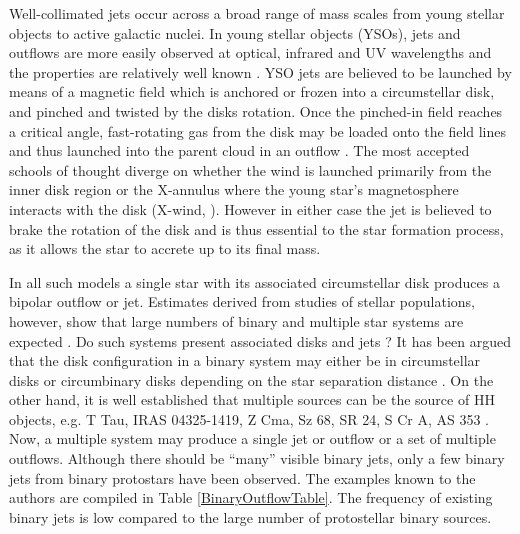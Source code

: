 \documentclass{aa}
\begin{document}
Well-collimated jets occur across a broad range of mass scales from young stellar objects to active galactic nuclei.
In young stellar objects (YSOs), jets and outflows are 
more easily observed at optical, infrared and UV wavelengths and the properties
are relatively well known \citep{2001ARA&A..39..403R,2007prpl.conf..231R}.
YSO jets are believed to be launched by means of a magnetic field which is 
anchored or frozen into a circumstellar disk, and pinched and twisted by the disks rotation. 
Once the pinched-in field reaches a critical angle, fast-rotating gas from the disk may be loaded onto the field lines and thus launched into the parent cloud in an outflow \citep{1982MNRAS.199..883B}.
The most accepted schools of thought diverge on whether the wind is launched primarily
from the inner disk region \citep[disk wind, ][]{1997A&A...319..340F,2000prpl.conf..759K} or the X-annulus where the young star's magnetosphere interacts with the disk (X-wind, \citep{2000prpl.conf..789S}). 
However in either case the jet is believed to brake the rotation of the disk 
and is thus essential to the star formation process, 
as it allows the star to accrete up to its final mass.

In all such models a single star with its associated circumstellar disk produces a bipolar outflow or jet. Estimates derived from studies of stellar populations, 
however, show that large numbers of 
binary and multiple star systems are expected
\citep{2002ApJ...581..654P,1995ApJ...443..625S,1993AJ....106.2005G,1991A&A...248..485D}. Do such systems present associated disks and jets ? 
It has been argued that the disk configuration in a binary system 
may either be in circumstellar 
disks or circumbinary disks depending on the star separation distance
\citep{2000prpl.conf..841H}.
On the other hand, it is well established
that multiple sources can be the 
source of HH objects, e.g. T Tau, IRAS 04325-1419, Z Cma, Sz 68, 
SR 24, S Cr A, AS 353 \citep{1993ApJ...408L..49R}.
Now, a multiple system may produce a single jet or outflow 
or a set of multiple outflows.
Although there should be ``many'' visible binary jets, only a 
few binary jets from binary protostars have been observed.
The examples known to the authors are compiled in Table 
\ref{BinaryOutflowTable}.
The frequency of existing binary jets is low compared to the 
large number of protostellar binary sources. 
\end{document}
